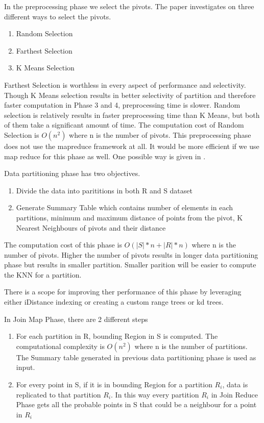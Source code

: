 \documentclass[conference]{IEEEtran}
\begin{document}
\bigskip

In the preprocessing phase we select the pivots. The paper
investigates on three different ways to select the pivots.
\begin{enumerate}
\item Random Selection
\item Farthest Selection
\item K Means Selection
\end{enumerate}

\medskip

Farthest Selection is worthless in every aspect of performance and
selectivity. Though K Means selection results in better selectivity of partition
and therefore faster computation in Phase 3 and 4, preprocessing time
is slower. Random selection is relatively results in faster
preprocessing time than K Means, but both of them take a significant
amount of time. The computation cost of Random Selection is $O(n^2)$
where n is the number of pivots. This preprocessing phase does not use the
mapreduce framework at all. It would be more efficient if we use map
reduce for this phase as well. One possible way is given in
\cite{kiefer_pairwise_2010}.

\bigskip

Data partitioning phase has two objectives.
\begin{enumerate}
\item Divide the data into parititions in both R and S dataset
\item Generate Summary Table which contains number of elements in each
  partitions, minimum and maximum distance of points from the pivot, K
  Nearest Neighbours of pivots and their distance
\end{enumerate}

\medskip

The computation cost of this phase is $O(|S|*n + |R|*n)$ where n is
the number of pivots. Higher the number of pivots results in longer
data partitioning phase but results in smaller partition. Smaller
parition will be easier to compute the KNN for a partition.

\medskip

There is a scope for improving ther performance of this phase by
leveraging either iDistance indexing \cite{jagadish_idistance:_2005}
or creating a custom range trees or kd trees.

\bigskip

In Join Map Phase, there are 2 different steps
\begin{enumerate}
\item For each partition in R, bounding Region in S is computed. The
  computational complexity is $O(n^2)$ where n is the number of
  partitions. The Summary table generated in previous data
  partitioning phase is used as input.
\item For every point in S, if it is in bounding Region for a
  partition $R_i$, data is replicated to that partition $R_i$. In this way
  every partition $R_i$ in Join Reduce Phase gets all the probable
  points in S that could be a neighbour for a point in $R_i$
\end{enumerate}
\end{document}
